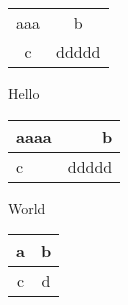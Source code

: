 \documentclass{article}
\begin{document}
 
  \begin{tabular}{|c|c|} 
    aaa & b \\ 
    c & ddddd\\ 
  \end{tabular} 

  Hello\\

  \begin{tabular}{|l|r|} 
    \hline 
    aaaa & b \\ 
    \hline 
    c & ddddd\\ 
    \hline 
  \end{tabular} 

  World\\

  \begin{center} 
    \begin{tabular}{|c|c|} 
      \hline 
      a & b \\ \hline 
      c & d\\ 
      \hline 
    \end{tabular} 
  \end{center} 
\end{document}
